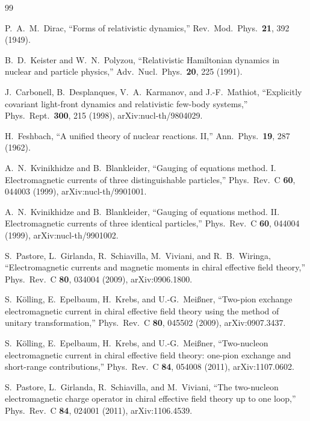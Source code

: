 \documentclass[11pt]{article}
\begin{document}
\small
\begin{thebibliography}{99}

P.~A.~M.~Dirac,
``Forms of relativistic dynamics,''
Rev.\ Mod.\ Phys.\ \textbf{21}, 392 (1949).

B.~D.~Keister and W.~N.~Polyzou,
``Relativistic Hamiltonian dynamics in nuclear and particle physics,''
Adv.\ Nucl.\ Phys.\ \textbf{20}, 225 (1991).

J.~Carbonell, B.~Desplanques, V.~A.~Karmanov, and J.-F.~Mathiot,
``Explicitly covariant light-front dynamics and relativistic few-body systems,''
Phys.\ Rept.\ \textbf{300}, 215 (1998), arXiv:nucl-th/9804029.

H.~Feshbach,
``A unified theory of nuclear reactions. II,''
Ann.\ Phys.\ \textbf{19}, 287 (1962).

A.~N.~Kvinikhidze and B.~Blankleider,
``Gauging of equations method. I. Electromagnetic currents of three
distinguishable particles,''
Phys.\ Rev.\ C \textbf{60}, 044003 (1999), arXiv:nucl-th/9901001.

A.~N.~Kvinikhidze and B.~Blankleider,
``Gauging of equations method. II. Electromagnetic currents of three identical
particles,''
Phys.\ Rev.\ C \textbf{60}, 044004 (1999), arXiv:nucl-th/9901002.

S.~Pastore, L.~Girlanda, R.~Schiavilla, M.~Viviani, and R.~B.~Wiringa,
``Electromagnetic currents and magnetic moments in chiral effective field
theory,''
Phys.\ Rev.\ C \textbf{80}, 034004 (2009), arXiv:0906.1800.

S.~K\"olling, E.~Epelbaum, H.~Krebs, and U.-G.~Mei\ss ner,
``Two-pion exchange electromagnetic current in chiral effective field theory
using the method of unitary transformation,''
Phys.\ Rev.\ C \textbf{80}, 045502 (2009), arXiv:0907.3437.

S.~K\"olling, E.~Epelbaum, H.~Krebs, and U.-G.~Mei\ss ner,
``Two-nucleon electromagnetic current in chiral effective field theory:
one-pion exchange and short-range contributions,''
Phys.\ Rev.\ C \textbf{84}, 054008 (2011), arXiv:1107.0602.

S.~Pastore, L.~Girlanda, R.~Schiavilla, and M.~Viviani,
``The two-nucleon electromagnetic charge operator in chiral effective field
theory up to one loop,''
Phys.\ Rev.\ C \textbf{84}, 024001 (2011), arXiv:1106.4539.


\end{thebibliography}
\end{document}
